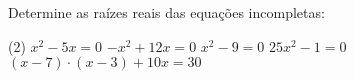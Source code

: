 \begin{question} %
Determine as raízes reais das equações incompletas:

\begin{tasks}(2)
        \task $x^2-5x=0$
        \task $-x^2+12x=0$
        \task $x^2-9=0$
        \task $25x^2-1=0$
        \task $(x-7) \cdot (x-3)+10x=30$
    \end{tasks}
\end{question}

